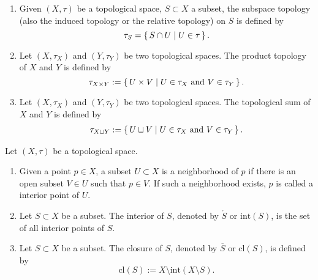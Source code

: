 \begin{defbox}
    \begin{definition}
        \begin{enumerate}
            \item Given \((X, \tau)\) be a {\color{mathif}topological space}, \(S \subset X\) a subset, the {\color{maththen}subspace topology} (also the induced topology or the relative topology) on \(S\) is defined by
            \begin{equation*}
                \tau_S = \left\{\, S \cap U \mid U \in \tau \,\right\} \text{.}
            \end{equation*}
            \item Let \((X, \tau_X)\) and \((Y, \tau_Y)\) be two {\color{mathif}topological spaces}. The product topology of \(X\) and \(Y\) is defined by
            \begin{equation*}
                \tau_{X \times Y} := \left\{\, U \times V \mid U \in \tau_X \text{ and } V \in \tau_Y \,\right\} \text{.}
            \end{equation*}
            \item Let \((X, \tau_X)\) and \((Y, \tau_Y)\) be two {\color{mathif}topological spaces}. The topological sum of \(X\) and \(Y\) is defined by
            \begin{align*}
                \tau_{X \sqcup Y} := \left\{\, U \sqcup V \mid U \in \tau_X \text{ and } V \in \tau_Y \,\right\} \text{.}
            \end{align*}
        \end{enumerate}
    \end{definition}
\end{defbox}

\begin{defbox}
    \begin{definition}
        Let \((X, \tau)\) be a topological space.
        \begin{enumerate}
            \item Given a {\color{mathobj}point} \(p \in X\), a subset \(U \subset X\) is a neighborhood of \(p\) if there is an open subset \(V \in U\) such that \(p \in V\). If such a neighborhood exists, \(p\) is called a interior point of \(U\).
            \item Let \(S \subset X\) be a subset. The interior of \(S\), denoted by \(\mathring{S}\) or \(\mathrm{int}(S)\), is the {\color{mathobj}set} of all interior points of \(S\).
            \item Let \(S \subset X\) be a subset. The closure of \(S\), denoted by \(\overline{S}\) or \(\mathrm{cl}(S)\), is defined by
            \begin{equation*}
                \mathrm{cl}(S) := X \setminus \mathrm{int}(X \setminus S) \text{.}
            \end{equation*}
        \end{enumerate}
    \end{definition}
\end{defbox}


